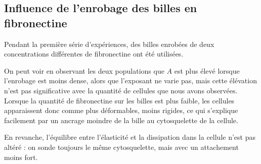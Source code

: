 \documentclass{report}
\begin{document}
\subsection{Influence de l'enrobage des billes en fibronectine}

Pendant la première série d'expériences, des billes enrobées de deux concentrations différentes de fibronectine ont été utilisées. 

On peut voir en observant les deux populations que $A$ est plus élevé lorsque l'enrobage est moins dense, alors que l'exposant ne varie pas, mais cette élévation n'est pas significative avec la quantité de cellules que nous avons observées.
Lorsque la quantité de fibronectine sur les billes est plus faible, les cellules apparaissent donc comme plus déformables, moins rigides, ce qui s'explique facilement par un ancrage moindre de la bille au cytosquelette de la cellule.  

En revanche, l'équilibre entre l'élasticité et la dissipation dans la cellule n'est pas altéré : on sonde toujours le même cytosquelette, mais avec un attachement moins fort. 
\end{document}
